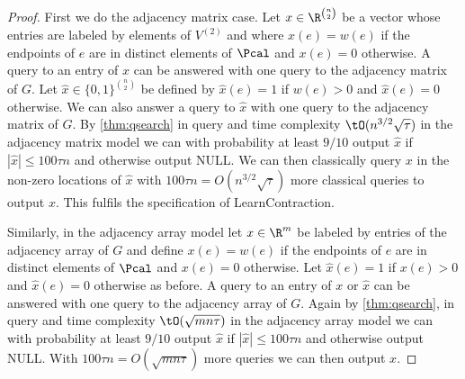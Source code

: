 \begin{proof}
First we do the adjacency matrix case.  Let $x \in \R^{\binom{n}{2}}$ be a vector whose entries are labeled by elements of $V^{(2)}$ and where $x(e) = w(e)$ if the endpoints of $e$ are in distinct elements of $\Pcal$ and $x(e) = 0$ otherwise.  
A query to an entry of $x$ can be answered with one query to the adjacency matrix of $G$.  Let $\hat{x} \in \{0,1\}^{\binom{n}{2}}$ be defined by $\hat{x}(e) = 1$ if $w(e) > 0$ and $\hat{x}(e) = 0$ otherwise.  We can also answer a query to $\hat{x}$ 
with one query to the adjacency matrix of $G$.  By \cref{thm:qsearch} in query and time complexity 
$\tO(n^{3/2}\sqrt{\tau})$ in the adjacency matrix model we can with probability at least $9/10$ 
output $\hat{x}$ if $|\hat{x}| \le 100 \tau n$ and otherwise output NULL.  We can then classically query $x$ in the non-zero locations of $\hat{x}$ with $100\tau n =O(n^{3/2} \sqrt{\tau})$ more classical queries to output $x$.  
This fulfils the specification of LearnContraction.

Similarly, in the adjacency array model let $x \in \R^{m}$ be labeled by entries of the adjacency array of $G$ and define $x(e) = w(e)$ if the endpoints of $e$ are in distinct elements of $\Pcal$ and 
$x(e) = 0$ otherwise.  Let $\hat{x}(e)=1$ if $x(e) >0$ and $\hat{x}(e)=0$ otherwise as before.
A query to an entry of $x$ or $\hat{x}$ can be answered with one query to the adjacency array of $G$.  Again by \cref{thm:qsearch}, in query and time complexity $\tO(\sqrt{mn \tau})$ in the adjacency array model we can with probability at least $9/10$ 
output $\hat{x}$ if $|\hat{x}| \le 100 \tau n$ and otherwise output NULL.  With $100 \tau n = O(\sqrt{mn\tau})$ more queries we can then output $x$.
\end{proof}

